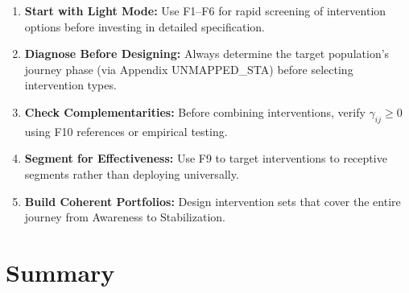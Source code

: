 \begin{tcolorbox}[colback=green!5!white, colframe=green!75!black,
    title=Practical Implications]
\begin{enumerate}
\item \textbf{Start with Light Mode:} Use F1--F6 for rapid screening of intervention options before investing in detailed specification.

\item \textbf{Diagnose Before Designing:} Always determine the target population's journey phase (via Appendix UNMAPPED_STA) before selecting intervention types.

\item \textbf{Check Complementarities:} Before combining interventions, verify $\gamma_{ij} \geq 0$ using F10 references or empirical testing.

\item \textbf{Segment for Effectiveness:} Use F9 to target interventions to receptive segments rather than deploying universally.

\item \textbf{Build Coherent Portfolios:} Design intervention sets that cover the entire journey from Awareness to Stabilization.
\end{enumerate}
\end{tcolorbox}



\section{Summary}
\label{sec:hhh-summary}

